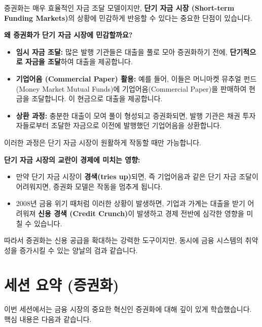 \documentclass[11pt,a4paper]{book}
\theoremstyle{definition}
\begin{document}
증권화는 매우 효율적인 자금 조달 모델이지만, \textbf{단기 자금 시장 (Short-term Funding Markets)}의 상황에 민감하게 반응할 수 있다는 중요한 단점이 있습니다.

\begin{tcolorbox}[
    colback=boxred,
    colframe=red!70!black,
    title=\textbf{단기 자금 시장과 증권화의 연결고리}
]
  \textbf{왜 증권화가 단기 자금 시장에 민감할까요?}
  \begin{itemize}
    \item \textbf{임시 자금 조달:} 많은 발행 기관들은 대출을 풀로 모아 증권화하기 전에, \textbf{단기적으로 자금을 조달}하여 대출을 제공합니다.
    \item \textbf{기업어음 (Commercial Paper) 활용:} 예를 들어, 이들은 머니마켓 뮤추얼 펀드(Money Market Mutual Funds)에 기업어음(Commercial Paper)을 판매하여 현금을 조달합니다. 이 현금으로 대출을 제공합니다.
    \item \textbf{상환 과정:} 충분한 대출이 모여 풀이 형성되고 증권화되면, 발행 기관은 채권 투자자들로부터 조달한 자금으로 이전에 발행했던 기업어음을 상환합니다.
  \end{itemize}
  이러한 과정은 단기 자금 시장이 원활하게 작동할 때만 가능합니다.

  \textbf{단기 자금 시장의 교란이 경제에 미치는 영향:}
  \begin{itemize}
    \item 만약 단기 자금 시장이 \textbf{경색(tries up)}되면, 즉 기업어음과 같은 단기 자금 조달이 어려워지면, 증권화 모델은 작동을 멈추게 됩니다.
    \item 2008년 금융 위기 때처럼 이러한 상황이 발생하면, 기업과 가계는 대출을 받기 어려워져 \textbf{신용 경색 (Credit Crunch)}이 발생하고 경제 전반에 심각한 영향을 미칠 수 있습니다.
  \end{itemize}
  따라서 증권화는 신용 공급을 확대하는 강력한 도구이지만, 동시에 금융 시스템의 취약성을 증가시킬 수 있는 양날의 검과 같습니다.
\end{tcolorbox}


\section{세션 요약 (증권화)}

이번 세션에서는 금융 시장의 중요한 혁신인 증권화에 대해 깊이 있게 학습했습니다. 핵심 내용은 다음과 같습니다.
\end{document}
